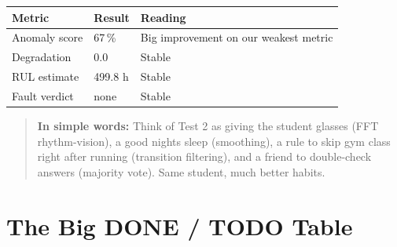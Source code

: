 \documentclass[11pt]{article}
\newenvironment{simplebox}
  {\par\medskip\noindent\begin{quote}\color{blue!55!black}\small
   \textbf{\textsf{In simple words:}}\space\space}
  {\end{quote}\medskip}
\begin{document}
\begin{center}
\begin{tabular}{lll}
\toprule
\textbf{Metric} & \textbf{Result} & \textbf{Reading} \\
\midrule
Anomaly score   & 67\,\%   & Big improvement on our weakest metric \\
Degradation     & 0.0      & Stable \\
RUL estimate    & 499.8 h  & Stable \\
Fault verdict   & none     & Stable \\
\bottomrule
\end{tabular}
\end{center}

\begin{simplebox}
Think of Test 2 as giving the student glasses (FFT rhythm-vision), a good
nights sleep (smoothing), a rule to skip gym class right after running
(transition filtering), and a friend to double-check answers (majority
vote). Same student, much better habits.
\end{simplebox}

\section{The Big DONE / TODO Table}
\end{document}
